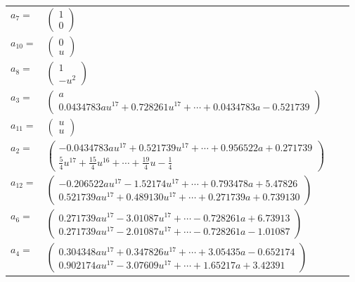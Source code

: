 \documentclass[1p]{elsarticle_modified}
\theoremstyle{definition}
\begin{document}
\begin{tabular}{m{7pt} m{180pt} m{7pt} m{180pt} }
\flushright $a_{7}=$&$\begin{pmatrix}1\\0\end{pmatrix}$ \\
\flushright $a_{10}=$&$\begin{pmatrix}0\\u\end{pmatrix}$ \\
\flushright $a_{8}=$&$\begin{pmatrix}1\\- u^2\end{pmatrix}$ \\
\flushright $a_{3}=$&$\begin{pmatrix}a\\0.0434783 a u^{17}+0.728261 u^{17}+\cdots+0.0434783 a-0.521739\end{pmatrix}$ \\
\flushright $a_{11}=$&$\begin{pmatrix}u\\u\end{pmatrix}$ \\
\flushright $a_{2}=$&$\begin{pmatrix}-0.0434783 a u^{17}+0.521739 u^{17}+\cdots+0.956522 a+0.271739\\\frac{5}{4} u^{17}+\frac{15}{4} u^{16}+\cdots+\frac{19}{4} u-\frac{1}{4}\end{pmatrix}$ \\
\flushright $a_{12}=$&$\begin{pmatrix}-0.206522 a u^{17}-1.52174 u^{17}+\cdots+0.793478 a+5.47826\\0.521739 a u^{17}+0.489130 u^{17}+\cdots+0.271739 a+0.739130\end{pmatrix}$ \\
\flushright $a_{6}=$&$\begin{pmatrix}0.271739 a u^{17}-3.01087 u^{17}+\cdots-0.728261 a+6.73913\\0.271739 a u^{17}-2.01087 u^{17}+\cdots-0.728261 a-1.01087\end{pmatrix}$ \\
\flushright $a_{4}=$&$\begin{pmatrix}0.304348 a u^{17}+0.347826 u^{17}+\cdots+3.05435 a-0.652174\\0.902174 a u^{17}-3.07609 u^{17}+\cdots+1.65217 a+3.42391\end{pmatrix}$ \\

\end{tabular}
\end{document}
